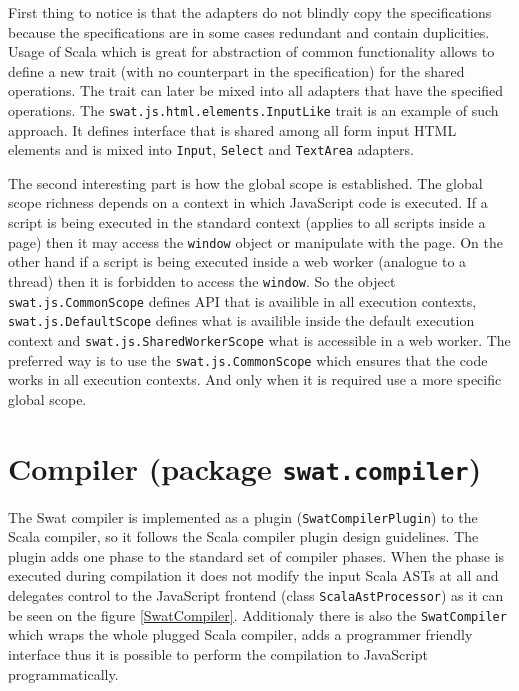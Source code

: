 \documentclass[12pt,a4paper]{report}
\begin{document}
First thing to notice is that the adapters do not blindly copy the specifications because the specifications are in some cases redundant and contain duplicities. Usage of Scala which is great for abstraction of common functionality allows to define a new trait (with no counterpart in the specification) for the shared operations. The trait can later be mixed into all adapters that have the specified operations. The \texttt{swat.js.html.elements.InputLike} trait is an example of such approach. It defines interface that is shared among all form input HTML elements and is mixed into \texttt{Input}, \texttt{Select} and \texttt{TextArea} adapters.

The second interesting part is how the global scope is established. The global scope richness depends on a context in which JavaScript code is executed. If a script is being executed in the standard context (applies to all scripts inside a page) then it may access the \texttt{window} object or manipulate with the page. On the other hand if a script is being executed inside a web worker (analogue to a thread) then it is forbidden to access the \texttt{window}. So the object \texttt{swat.js.CommonScope} defines API that is availible in all execution contexts, \texttt{swat.js.DefaultScope} defines what is availible inside the default execution context and \texttt{swat.js.SharedWorkerScope} what is accessible in a web worker. The preferred way is to use the \texttt{swat.js.CommonScope} which ensures that the code works in all execution contexts. And only when it is required use a more specific global scope.

\section{Compiler (package \texttt{swat.compiler})}

The Swat compiler is implemented as a plugin (\texttt{SwatCompilerPlugin}) to the Scala compiler, so it follows the Scala compiler plugin design guidelines\cite{CompilerPlugins}. The plugin adds one phase to the standard set of compiler phases. When the phase is executed during compilation it does not modify the input Scala ASTs at all and delegates control to the JavaScript frontend (class \texttt{ScalaAstProcessor}) as it can be seen on the figure \ref{SwatCompiler}. Additionaly there is also the \texttt{SwatCompiler} which wraps the whole plugged Scala compiler, adds a programmer friendly interface thus it is possible to perform the compilation to JavaScript programmatically.
\end{document}
